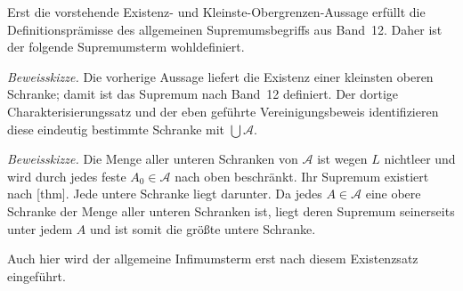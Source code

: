 \documentclass[main.tex]{subfiles}
\begin{document}
Erst die vorstehende Existenz- und Kleinste-Obergrenzen-Aussage erfüllt die
Definitionsprämisse des allgemeinen Supremumsbegriffs aus Band~12. Daher ist
der folgende Supremumsterm wohldefiniert.


\emph{Beweisskizze.}
Die vorherige Aussage liefert die Existenz einer kleinsten oberen Schranke;
damit ist das Supremum nach Band~12 definiert. Der dortige
Charakterisierungssatz und der eben geführte Vereinigungsbeweis identifizieren
diese eindeutig bestimmte Schranke mit \(\bigcup\mathcal A\).


\emph{Beweisskizze.}
Die Menge aller unteren Schranken von \(\mathcal A\) ist wegen \(L\)
nichtleer und wird durch jedes feste \(A_0\in\mathcal A\) nach oben
beschränkt. Ihr Supremum existiert nach
[thm]. Jede untere Schranke liegt
darunter. Da jedes \(A\in\mathcal A\) eine obere Schranke der Menge aller
unteren Schranken ist, liegt deren Supremum seinerseits unter jedem \(A\) und
ist somit die größte untere Schranke.

Auch hier wird der allgemeine Infimumsterm erst nach diesem Existenzsatz
eingeführt.
\end{document}
